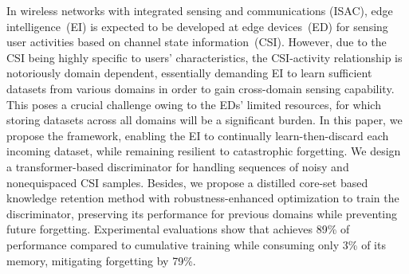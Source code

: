 In wireless networks with integrated sensing and communications (ISAC), edge intelligence~(EI) is expected to be developed at edge devices~(ED) for sensing user activities based on channel state information~(CSI).
However, due to the CSI being highly specific to users' characteristics, the CSI-activity relationship is notoriously domain dependent, essentially demanding EI to learn sufficient datasets from various domains in order to gain cross-domain sensing capability.
This poses a crucial challenge owing to the EDs' limited resources, for which storing datasets across all domains will be a significant burden.
In this paper, we propose the \emph{\name} framework, enabling the EI to continually learn-then-discard each incoming dataset, while remaining resilient to catastrophic forgetting.
We design a transformer-based discriminator for handling sequences of noisy and nonequispaced CSI samples.
Besides, we propose a distilled core-set based knowledge retention method with robustness-enhanced optimization to train the discriminator, preserving its performance for previous domains while preventing future forgetting.
Experimental evaluations show that \name achieves 89\% of performance compared to cumulative training while consuming only 3\% of its memory, mitigating forgetting by 79\%. 

\endinput